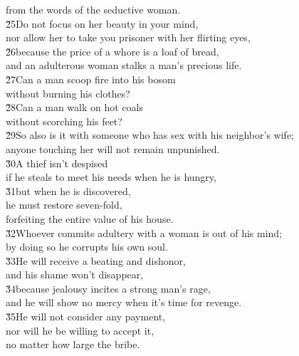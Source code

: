 \begin{poetry}
\poemll    from the words of the seductive woman. \\
\poeml \v{25}Do not focus on her beauty in your mind, \\
\poemll    nor allow her to take you prisoner with her flirting eyes, \\
\poeml \v{26}because the price of a whore is a loaf of bread, \\
\poemll    and an adulterous woman stalks a man's precious life. \\
\poeml \v{27}Can a man scoop fire into his bosom \\
\poemll    without burning his clothes? \\
\poeml \v{28}Can a man walk on hot coals \\
\poemll    without scorching his feet? \\
\poeml \v{29}So also is it with someone who has sex with his neighbor's wife; \\
\poemll    anyone touching her will not remain unpunished. \\
\poeml \v{30}A thief isn't despised \\
\poemll    if he steals to meet his needs when he is hungry, \\
\poeml \v{31}but when he is discovered, \\
\poemll    he must restore seven-fold, \\
\poemlll       forfeiting the entire value of his house. \\
\poeml \v{32}Whoever commits adultery with a woman is out of his mind; \\
\poemll    by doing so he corrupts his own soul. \\
\poeml \v{33}He will receive a beating and dishonor, \\
\poemll    and his shame won't disappear, \\
\poeml \v{34}because jealousy incites a strong man's rage, \\
\poemll    and he will show no mercy when it's time for revenge. \\
\poeml \v{35}He will not consider any payment, \\
\poemll    nor will he be willing to accept it, \\
\poemlll       no matter how large the bribe.
\end{poetry}

